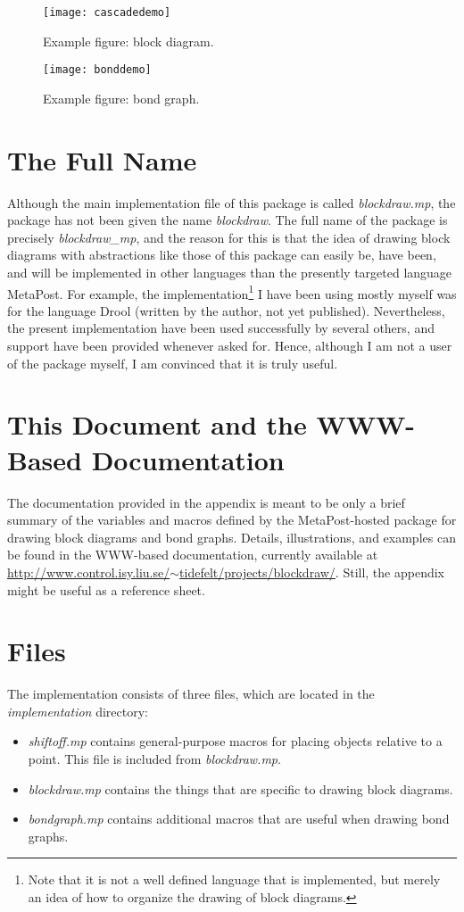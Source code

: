 \documentclass{ltxdoc}
\begin{document}
\begin{figure}[tbp]
  \centering
  \texttt{[image: cascadedemo]}
  \caption{Example figure: block diagram.}
\end{figure}

\begin{figure}[tbp]
  \centering
  \texttt{[image: bonddemo]}  
  \caption{Example figure: bond graph.}
\end{figure}


\section{The Full Name}%
%
Although the main implementation file of this package is called \emph{blockdraw.mp}, the package has not been given the name \emph{blockdraw}.  The full name of the package is precisely \emph{blockdraw\_{}mp}, and the reason for this is that the idea of drawing block diagrams with abstractions like those of this package can easily be, have been, and will be implemented in other languages than the presently targeted language MetaPost.  For example, the implementation\footnote{%
Note that it is not a well defined language that is implemented, but merely an idea of how to organize the drawing of block diagrams.
} %
I have been using mostly myself was for the language Drool (written by the author, not yet published).  Nevertheless, the present implementation have been used successfully by several others, and support have been provided whenever asked for.  Hence, although I am not a user of the package myself, I am convinced that it is truly useful.

\section{This Document and the WWW-Based Documentation}%
%
The documentation provided in the appendix is meant to be only a brief summary of the variables and macros defined by the MetaPost-hosted package for drawing block diagrams and bond graphs.  Details, illustrations, and examples can be found in the WWW-based documentation, currently available at \href{http://www.control.isy.liu.se/~tidefelt/projects/blockdraw/}{http://www.control.isy.liu.se/$\sim$tidefelt/projects/blockdraw/}.  Still, the appendix might be useful as a reference sheet.

\section{Files}%
%
The implementation consists of three files, which are located in the \emph{implementation} directory:
\begin{itemize}
\item \emph{shiftoff.mp} contains general-purpose macros for placing objects relative to a point.  This file is included from \emph{blockdraw.mp}.
\item \emph{blockdraw.mp} contains the things that are specific to drawing block diagrams.
\item \emph{bondgraph.mp} contains additional macros that are useful when drawing bond graphs.
\end{itemize}
\end{document}
